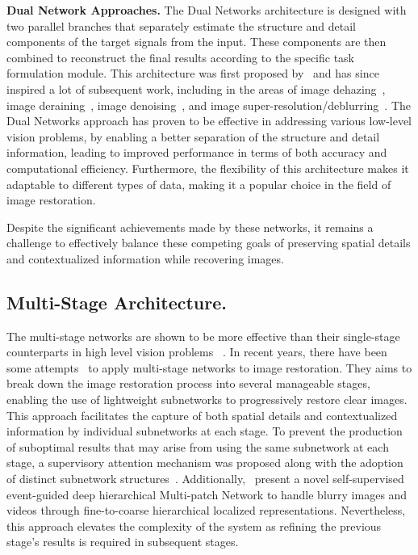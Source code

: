 \documentclass[sn-mathphys,Numbered]{sn-jnl}
\theoremstyle{thmstyleone}\newtheorem{theorem}{Theorem}\newtheorem{proposition}[theorem]{Proposition}
\theoremstyle{thmstyletwo}\newtheorem{example}{Example}\newtheorem{remark}{Remark}
\theoremstyle{thmstylethree}\newtheorem{definition}{Definition}
\begin{document}
\textbf{Dual Network Approaches.} The Dual Networks architecture is designed with two parallel branches that separately estimate the structure and detail components of the target signals from the input. These components are then combined to reconstruct the final results according to the specific task formulation module. This architecture was first proposed by~\cite{2018LearningD} and has since inspired a lot of subsequent work, including in the areas of image dehazing~\cite{2018DehazeGAN,2019Dense,2019Dual}, image deraining~\cite{2018Fast}, image denoising~\cite{tian2021designing}, and image super-resolution/deblurring~\cite{2020Refining}. The Dual Networks approach has proven to be effective in addressing various low-level vision problems, by enabling a better separation of the structure and detail information, leading to improved performance in terms of both accuracy and computational efficiency. Furthermore, the flexibility of this architecture makes it adaptable to different types of data, making it a popular choice in the field of image restoration.

Despite the significant achievements made by these networks, it remains a challenge to effectively balance these competing goals of preserving spatial details and contextualized information while recovering images.
\subsection{Multi-Stage Architecture.}
The multi-stage networks are shown to be more effective than their single-stage counterparts in high level vision problems  ~\cite{Li2019RethinkingOM,15Cheng2019SPGNetSP,26Ghosh2018StackedSG,45li2020ms}. In recent years, there have been some attempts~\cite{2018Scale,2018Lightweight,RESCAN,PREnet,Zamir2021MPRNet,zhang2022event,Zhang_2019_CVPR} to apply multi-stage networks to image restoration. They aims to break down the image restoration process into several manageable stages, enabling the use of lightweight subnetworks to progressively restore clear images.  This approach facilitates the capture of both spatial details and contextualized information by individual subnetworks at each stage. To prevent the production of suboptimal results that may arise from using the same subnetwork at each stage, a supervisory attention mechanism was proposed along with the adoption of distinct subnetwork structures~\cite{Zamir2021MPRNet}. Additionally,~\cite{zhang2022event} present a novel self-supervised event-guided deep hierarchical Multi-patch Network to handle blurry images and videos through fine-to-coarse hierarchical localized representations.  Nevertheless, this approach elevates the complexity of the system as refining the previous stage's results is required in subsequent stages.
\end{document}
